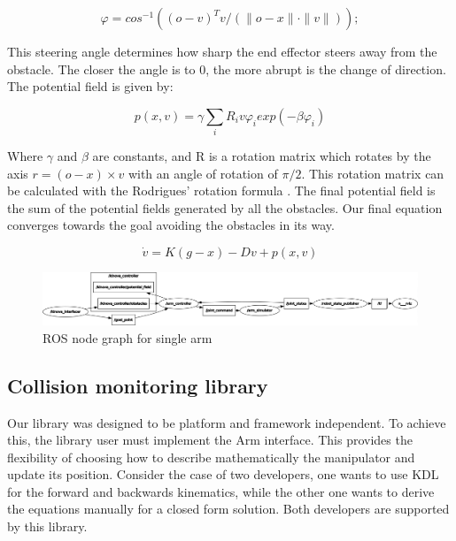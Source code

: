 \documentclass[a4paper, 10pt, conference]{ieeeconf}      %
\begin{document}
\begin{equation} \label{eq:2}
	\varphi = cos^{-1} ((o-v)^T v / (\|o-x\| \cdot \|v\|));
\end{equation}

This steering angle determines how sharp the end effector steers away from the obstacle. The closer the angle is to 0, the more abrupt is the change of direction. The potential field is given by:

\begin{equation}
	p(x, v) = \gamma \sum_i R_i v \varphi_i exp(-\beta \varphi_i) 
\end{equation}

Where $\gamma$ and $\beta$ are constants, and R is a rotation matrix which rotates by the axis $r = (o-x) \times v $ with an angle of rotation of $\pi/2$. This rotation matrix can be calculated with the Rodrigues' rotation formula \cite{rodrigues}. The final potential field is the sum of the potential fields generated by all the obstacles. Our final equation converges towards the goal avoiding the obstacles in its way.

\begin{equation}
\dot{v} = K ( g - x ) - D v + p(x, v)
\end{equation}

\begin{figure}[t]
	\centering
	\includegraphics[scale=0.25]{images/rosgraph_single.png}
	\caption{ROS node graph for single arm}
	\label{fig:rosgraph_single}
\end{figure}

\subsection{Collision monitoring library} %

Our library was designed to be platform and framework independent. To achieve this, the library user must implement the Arm interface. This provides the flexibility of choosing how to describe mathematically the manipulator and update its position. Consider the case of two developers, one wants to use KDL for the forward and backwards kinematics, while the other one wants to derive the equations manually for a closed form solution. Both developers are supported by this library. 
\end{document}
